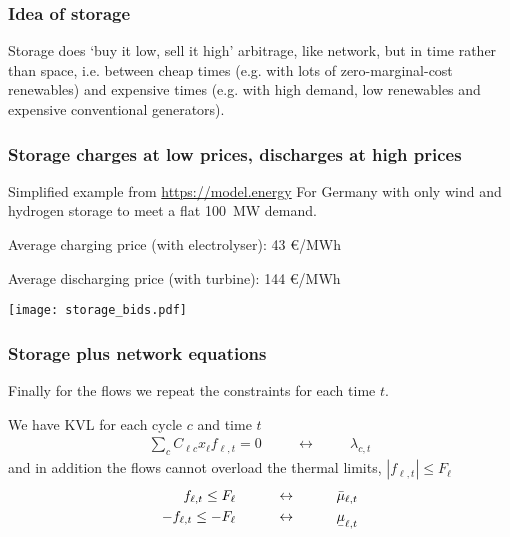 \documentclass[10pt,aspectratio=169,dvipsnames]{beamer}
\def\l{\lambda}
\def\m{\mu}
\newcommand{\ubar}[1]{\text{\b{$#1$}}}
\begin{document}
\begin{frame}[fragile]
  \frametitle{Idea of storage}


  Storage does `buy it low, sell it high' \alert{arbitrage}, like network, but
  in time rather than space, i.e. between cheap times (e.g. with lots
  of zero-marginal-cost renewables) and expensive times (e.g. with
  high demand, low renewables and expensive conventional generators).



\end{frame}



\begin{frame}[fragile]
  \frametitle{Storage charges at low prices, discharges at high prices}

  Simplified example from \url{https://model.energy} For Germany with only wind and hydrogen storage to meet a flat 100~MW demand.

  Average charging price (with electrolyser): 43 \euro/MWh

  Average discharging price (with turbine): 144 \euro/MWh

    \centering \texttt{[image: storage\_bids.pdf]}



\end{frame}



\begin{frame}[fragile]
  \frametitle{Storage plus network equations}



  Finally for the flows we repeat the constraints for each time $t$.

  We have KVL for each cycle $c$ and time $t$
  \begin{align*}
    \sum_{c} C_{\ell c} x_\ell f_{\ell,t} = 0  \hspace{1cm}\leftrightarrow\hspace{1cm} \l_{c,t}
  \end{align*}
  and in addition the flows cannot overload the thermal limits, $|f_{\ell,t}| \leq F_\ell$
  \begin{align*}
    f_{\ell,t} \leq F_\ell  \hspace{1cm}\leftrightarrow\hspace{1cm} \bar{\m}_{\ell,t} \\
        - f_{\ell,t} \leq - F_\ell  \hspace{1cm}\leftrightarrow\hspace{1cm} \ubar{\m}_{\ell,t}
  \end{align*}

\end{frame}
\end{document}
